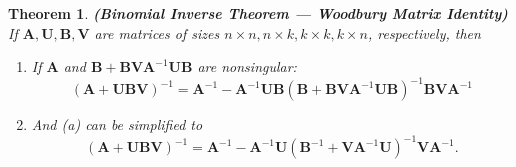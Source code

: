 \documentclass[13pt]{article}
\newtheorem{theorem}{Theorem}[section]
\theoremstyle{definition}
\theoremstyle{remark}
\begin{document}
\begin{theorem} \label{theo:Binomial Inverse Theorem}\textbf{(Binomial Inverse Theorem  --- Woodbury Matrix Identity)}
    If $\mathbf{\mathbf{A}}, \mathbf{U}, \mathbf{\mathbf{B}}, \mathbf{\mathbf{V}}$ are matrices of sizes $n \times n, n \times k, k \times k, k \times n$, respectively, then
    \begin{enumerate}[label=(\alph*)]
        \item If $\mathbf{\mathbf{A}}$ and $\mathbf{\mathbf{B}}+\mathbf{\mathbf{B} \mathbf{V} \mathbf{A}}^{-1} \mathbf{U \mathbf{B}}$ are nonsingular:
        $$
        (\mathbf{\mathbf{A}}+\mathbf{U} \mathbf{B} \mathbf{\mathbf{V}})^{-1}=\mathbf{\mathbf{A}}^{-1}-\mathbf{\mathbf{A}}^{-1} \mathbf{U \mathbf{B}}\left(\mathbf{\mathbf{B}}+\mathbf{\mathbf{B} \mathbf{V} \mathbf{A}}^{-1} \mathbf{U \mathbf{B}}\right)^{-1} \mathbf{\mathbf{B} \mathbf{V} \mathbf{A}}^{-1}
        $$
        \item And (a) can be simplified to
        $$
        (\mathbf{\mathbf{A}}+\mathbf{U \mathbf{B} \mathbf{V}})^{-1}=\mathbf{\mathbf{A}}^{-1}-\mathbf{\mathbf{A}}^{-1} \mathbf{U}\left(\mathbf{\mathbf{B}}^{-1}+\mathbf{\mathbf{V} \mathbf{A}}^{-1} \mathbf{U}\right)^{-1} \mathbf{\mathbf{V} \mathbf{A}}^{-1} .
        $$
    \end{enumerate}
\end{theorem}
\end{document}
